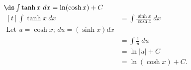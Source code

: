 {$\ds \int \tanh x\ dx  = \ln (\cosh x) + C$}
{\hfill$\begin{aligned}[t]
		\int \tanh x\ dx &= \int \frac{\sinh x}{\cosh x}\ dx\\
											\text{Let $u = \cosh x$; $du = (\sinh x) dx$} \\	
											&= \int \frac{1}{u}\ du \\
											&= \ln |u| + C \\
											&= \ln (\cosh x) + C.
\end{aligned}$\hfill\null}
